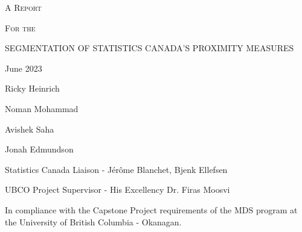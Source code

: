 \documentclass[11pt, a4paper]{article}
\begin{document}
\begin{center}
\textsc{A Report} \par
\small{\textsc{For the}} \par
\Large{\textsc{SEGMENTATION OF STATISTICS CANADA’S PROXIMITY MEASURES}}
\par
\vspace{0.917 pc} %
\par
\normalsize{ }

\thispagestyle{empty}

\vspace{8 pc} %


\par
June 2023	
\par
\vspace{8pc}

Ricky Heinrich \par
Noman Mohammad \par
Avishek Saha \par 
Jonah Edmundson


\par
\vfill
\thispagestyle{empty}
\par
\noindent\small{Statistics Canada Liaison - Jérôme Blanchet, Bjenk Ellefsen}
\par
\noindent\small{UBCO Project Supervisor - His Excellency Dr. Firas Moosvi}
\par
\vspace{2pc}
\par
\noindent\tiny{In compliance with the Capstone Project requirements of the MDS program at the University of British Columbia - Okanagan.}
\end{center}
\normalsize

\pagebreak



\thispagestyle{empty}
\setcounter{tocdepth}{2} %
\tableofcontents
\thispagestyle{empty}

\pagebreak
\thispagestyle{empty}
\listoffigures
\thispagestyle{empty}

\vspace{2pc}

\pagebreak
\thispagestyle{empty}
\listoftables
\pagebreak


\end{document}
